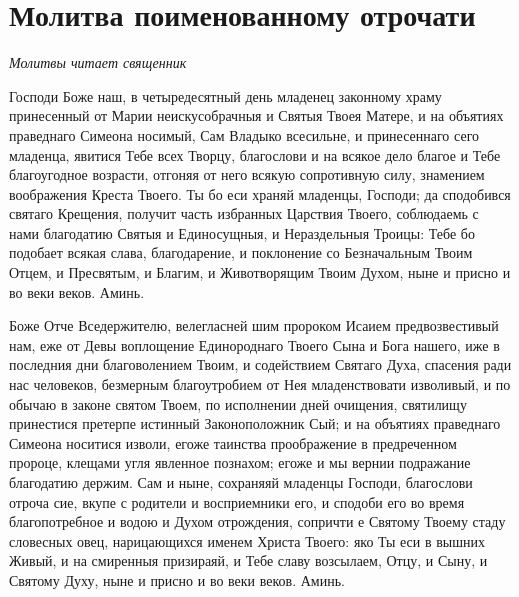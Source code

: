 \mychapterending





\section{Молитва поименованному отрочати}\begin{mymulticols}



\itshape Молитвы читает священник\normalfont{}

Господи Боже наш, в четыредесятный день младенец законному храму принесенный от Марии неискусобрачныя и Святыя Твоея Матере, и на объятиях праведнаго Симеона носимый, Сам Владыко всесильне, и принесеннаго сего младенца, явитися Тебе всех Творцу, благослови и на всякое дело благое и Тебе благоугодное возрасти, отгоняя от него всякую сопротивную силу, знамением воображения Креста Твоего. Ты бо еси храняй младенцы, Господи; да сподобився святаго Крещения, получит часть избранных Царствия Твоего, соблюдаемь с нами благодатию Святыя и Единосущныя, и Нераздельныя Троицы: Тебе бо подобает всякая слава, благодарение, и поклонение со Безначальным Твоим Отцем, и Пресвятым, и Благим, и Животворящим Твоим Духом, ныне и присно и во веки веков. Аминь.


Боже Отче Вседержителю, велегласней шим пророком Исаием предвозвестивый нам, еже от Девы воплощение Единороднаго Твоего Сына и Бога нашего, иже в последния дни благоволением Твоим, и содействием Святаго Духа, спасения ради нас человеков, безмерным благоутробием от Нея младенствовати изволивый, и по обычаю в законе святом  Твоем, по исполнении дней очищения, святилищу принестися претерпе истинный Законоположник Сый; и на объятиях праведнаго Симеона носитися изволи, егоже таинства проображение в предреченном пророце, клещами угля явленное познахом; егоже и мы вернии подражание благодатию держим. Сам и ныне, сохраняяй младенцы Господи, благослови отроча сие, вкупе с родители и восприемники его, и сподоби его во время благопотребное и водою и Духом отрождения, сопричти е Святому Твоему стаду словесных овец, нарицающихся именем Христа Твоего: яко Ты еси в вышних Живый, и на смиренныя призираяй, и Тебе славу возсылаем, Отцу, и Сыну, и Святому Духу, ныне и присно и во веки веков. Аминь.





\end{mymulticols}

